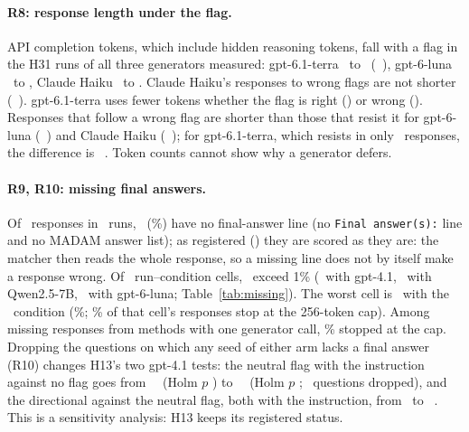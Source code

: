 \paragraph{R8: response length under the flag.} API completion tokens, which include hidden reasoning tokens, fall
with a flag in the H31 runs of all three generators measured: gpt-6.1-terra \tokTerraPlain\ to \tokTerraFlag\ (\tokTerraDiff\
\tokTerraDiffCI), gpt-6-luna \tokLunaPlain\ to \tokLunaFlag, Claude Haiku \tokHaikuPlain\ to \tokHaikuFlag. Claude
Haiku's responses to wrong flags are not shorter (\tokHaikuWrongDiff\ \tokHaikuWrongDiffCI). gpt-6.1-terra uses
fewer tokens whether the flag is right (\tokTerraRightDiff) or wrong (\tokTerraWrongDiff). Responses that follow a
wrong flag are shorter than those that resist it for gpt-6-luna (\tokLunaWrongFolDiff\ \tokLunaWrongFolDiffCI) and
Claude Haiku (\tokHaikuWrongFolDiff\ \tokHaikuWrongFolDiffCI); for gpt-6.1-terra, which resists in only
\tokTerraWrongNotFolRows\ responses, the difference is \tokTerraWrongFolDiff\ \tokTerraWrongFolDiffCI. Token counts
cannot show why a generator defers.


\paragraph{R9, R10: missing final answers.} Of \missRows\ responses in \missRuns\ runs, \missN\ (\missShare\%) have no
final-answer line (no \texttt{Final answer(s):} line and no MADAM answer list); as registered (\prs{5}) they are
scored as they are: the matcher then reads the whole response, so a missing line does not by itself make a response
wrong. Of \missCells\ run--condition cells,
\missCellsAbove\ exceed 1\% (\missAboveFour\ with gpt-4.1, \missAboveQwen\ with Qwen2.5-7B,
\missAboveLuna\ with gpt-6-luna; Table~\ref{tab:missing}). The worst cell is \missTopModel\ with the \missTopCond\ condition
(\missTopShare\%; \missTopCap\% of that cell's responses stop at the 256-token cap). Among missing responses from
methods with one generator call, \missCapShare\% stopped at the cap. Dropping the questions on which any seed of
either arm lacks a final answer (R10) changes H13's two gpt-4.1 tests: the neutral flag with the instruction against no
flag goes from \sensNeuReg\ \sensNeuRegCI\ (Holm $p$ \sensNeuRegP) to \sensNeu\ \sensNeuCI\ (Holm $p$ \sensNeuP;
\sensNeuDropped\ questions dropped), and the directional against the neutral flag, both with the instruction, from \sensDirReg\ to
\sensDir\ \sensDirCI. This is a sensitivity analysis: H13 keeps its registered status.

